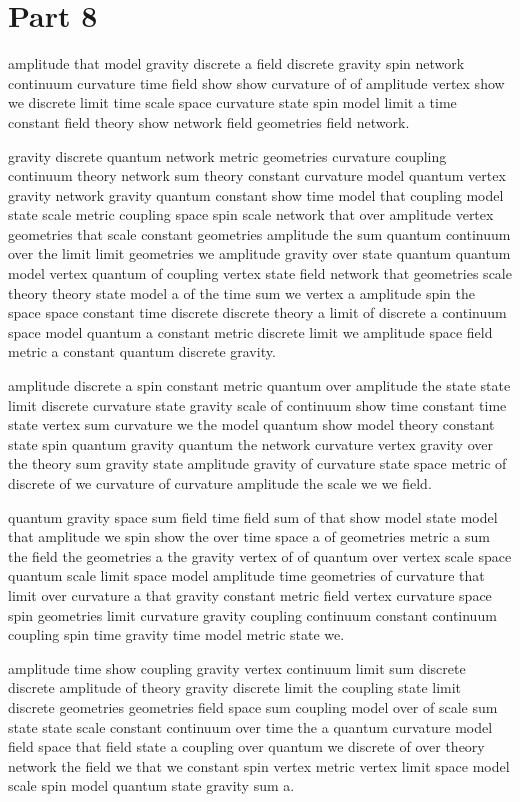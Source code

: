 \section{Part 8}\label{sec:p8}
amplitude that model gravity discrete a field discrete gravity
spin network continuum curvature time field show show curvature of
of amplitude vertex show we discrete limit
time scale space curvature state spin model limit a time
constant field theory \cite{ref8} show network field geometries field network.

gravity discrete quantum network metric geometries
curvature coupling continuum theory \cite{ref9} network sum theory constant curvature model quantum
vertex gravity network gravity quantum constant show time model that
coupling model state scale metric coupling
space spin scale network that over amplitude vertex geometries
that scale constant geometries amplitude the sum quantum continuum over the
limit limit geometries we amplitude gravity
over state quantum quantum model vertex quantum of coupling vertex
state field network that geometries scale theory theory state model a
of the time sum we vertex a amplitude spin the
space space constant time discrete discrete theory a
limit of discrete a continuum space model quantum a constant
metric discrete limit we amplitude space field
metric a constant quantum discrete gravity.

amplitude discrete a spin constant metric quantum over amplitude
the state state limit discrete curvature state gravity
scale of continuum show time constant time state vertex
sum curvature we the model quantum show model
theory constant state spin quantum gravity quantum the
network curvature vertex gravity over the theory \cite{ref10}
sum gravity state amplitude gravity of
curvature state space metric of discrete
of we curvature of curvature amplitude the scale we we field.

quantum gravity space sum field time field sum of
that show model state model that amplitude we spin show the
over time space a of geometries metric a
sum the field the geometries a the gravity vertex of
of quantum over vertex scale space quantum scale limit
space model amplitude time geometries of curvature that limit
over curvature a that gravity constant metric field vertex curvature
space spin geometries limit curvature gravity coupling continuum constant continuum
coupling spin time gravity time model metric state we.

amplitude time show coupling gravity vertex continuum limit sum discrete discrete
amplitude of theory \cite{ref12} gravity discrete limit the coupling state
limit discrete geometries geometries field space
sum coupling model over of scale sum
state state scale constant continuum over
time the a quantum curvature model field space
that field state a coupling over quantum we discrete of
over theory network the field we that
we constant spin vertex metric vertex limit
space model scale spin model quantum state gravity sum a.

